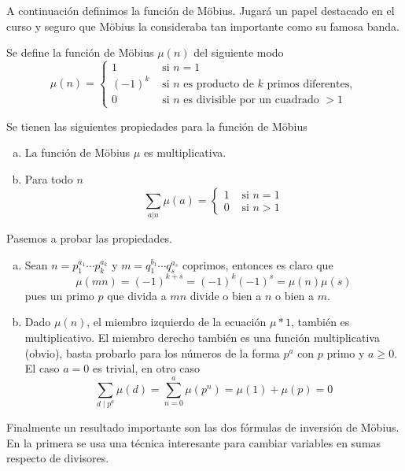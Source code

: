 \documentclass[TAN.tex]{subfiles}
\begin{document}
A continuación definimos la función de Möbius. Jugará un papel destacado en el curso y seguro que Möbius la consideraba tan importante como su famosa banda.

\begin{defi}
Se define la función de Möbius $μ(n)$ del siguiente modo
\[ μ(n) = \begin{cases}
	1 &\text{ si }n=1\\
	(-1)^k &\text{ si }n\text{ es producto de }k\text{ primos diferentes},\\
	0 &\text{ si }n\text{ es divisible por un cuadrado }>1
\end{cases}\]
\end{defi}

\begin{prop} Se tienen las siguientes propiedades para la función de Möbius
\begin{enumerate}[(a)]
\item La función de Möbius $μ$ es multiplicativa.
\item Para todo $n$
\[ \sum_{a|n} μ(a) = \begin{cases}
	1 & \text{ si } n = 1\\
	0 & \text{ si } n > 1
\end{cases}\]
\end{enumerate} 
\begin{dem}Pasemos a probar las propiedades.
\begin{enumerate}[(a)]
\item Sean $n=p_1^{a_1}\cdots p_k^{a_k}$ y $m=q_1^{b_1}\cdots q_s^{a_s}$ coprimos, entonces es claro que $$\mu(mn)=(-1)^{k+s}=(-1)^k(-1)^s=\mu(n)\mu(s)$$ pues un primo $p$ que divida a $mn$ divide o bien a $n$ o bien a $m$.
\item Dado $\mu(n)$, el miembro izquierdo de la ecuación $\mu \ast 1$, también es multiplicativo. El miembro derecho también es una función multiplicativa (obvio), basta probarlo para los números de la forma $p^a$ con $p$ primo y $a\geq 0$. El caso $a=0$ es trivial, en otro caso
$$
\sum_{d \mid p^a} \mu (d) = \sum_{n=0}^a \mu(p^n) = \mu(1)+\mu(p)=0
$$
\end{enumerate}
\end{dem}
\end{prop}

Finalmente un resultado importante son las dos fórmulas de inversión de Möbius.
En la primera se usa una técnica interesante para cambiar variables en sumas respecto de divisores.
\end{document}
